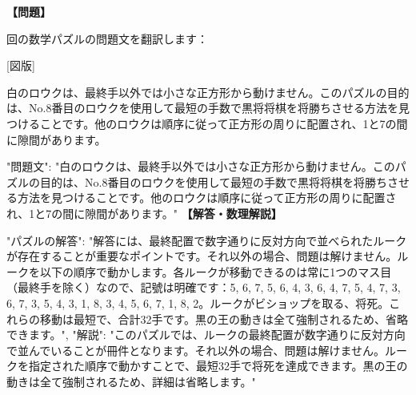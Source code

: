\documentclass[10pt,a4paper,oneside,openany]{ltjsbook}
\begin{document}
\begin{tcolorbox}[colback=softblue,colframe=primaryblue,title=\textbf{第 348 問：THE ROOKERY.},arc=2mm,boxrule=1pt,breakable]
\textbf{【問題】}\par\vspace{0.3em}
回の数学パズルの問題文を翻訳します：

[図版]

白のロウクは、最終手以外では小さな正方形から動けません。このパズルの目的は、No.8番目のロウクを使用して最短の手数で黒将将棋を将勝ちさせる方法を見つけることです。他のロウクは順序に従って正方形の周りに配置され、1と7の間に隙間があります。

{
  "問題文": "白のロウクは、最終手以外では小さな正方形から動けません。このパズルの目的は、No.8番目のロウクを使用して最短の手数で黒将将棋を将勝ちさせる方法を見つけることです。他のロウクは順序に従って正方形の周りに配置され、1と7の間に隙間があります。"
}
\tcblower
\textbf{【解答・数理解説】}\par\vspace{0.3em}
{
"パズルの解答": "解答には、最終配置で数字通りに反対方向で並べられたルークが存在することが重要なポイントです。それ以外の場合、問題は解けません。ルークを以下の順序で動かします。各ルークが移動できるのは常に1つのマス目（最終手を除く）なので、記號は明確です：5, 6, 7, 5, 6, 4, 3, 6, 4, 7, 5, 4, 7, 3, 6, 7, 3, 5, 4, 3, 1, 8, 3, 4, 5, 6, 7, 1, 8, 2。ルークがビショップを取る、将死。これらの移動は最短で、合計32手です。黒の王の動きは全て強制されるため、省略できます。",
"解説": "このパズルでは、ルークの最終配置が数字通りに反対方向で並んでいることが冊件となります。それ以外の場合、問題は解けません。ルークを指定された順序で動かすことで、最短32手で将死を達成できます。黒の王の動きは全て強制されるため、詳細は省略します。"
}
\end{tcolorbox}
\end{document}
